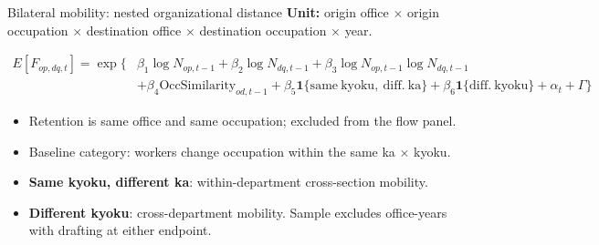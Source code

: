 

\begin{frame}[t]{Bilateral mobility: nested organizational distance}
    \small
    \vspace{0.4em}
    \textbf{Unit:} origin office $\times$ origin occupation $\times$ destination office $\times$ destination occupation $\times$ year.

    \vspace{0.8em}
    \begin{align*}
    E[F_{o p, d q, t}] =
    \exp\{&
        \beta_1 \log N_{o p,t-1}
        + \beta_2 \log N_{d q,t-1}
        + \beta_3 \log N_{o p,t-1}\log N_{d q,t-1} \\
        &+ \beta_4 \mathrm{OccSimilarity}_{od,t-1}
        + \beta_5 \mathbf{1}\{\mathrm{same\ kyoku,\ diff.\ ka}\}
        + \beta_6 \mathbf{1}\{\mathrm{diff.\ kyoku}\}
        + \alpha_t + \Gamma
    \}
    \end{align*}

    \vspace{0.4em}
    \begin{itemize}
        \item Retention is same office and same occupation; excluded from the flow panel.
        \item Baseline category: workers change occupation within the same ka $\times$ kyoku.
        \item \textbf{Same kyoku, different ka}: within-department cross-section mobility.
        \item \textbf{Different kyoku}: cross-department mobility. Sample excludes office-years with drafting at either endpoint.
    \end{itemize}
\end{frame}


